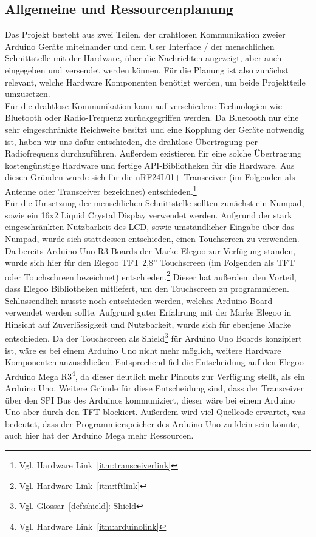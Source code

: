 \documentclass[a4paper, 11pt]{scrartcl}
\begin{document}
\subsection{Allgemeine und Ressourcenplanung}\label{ch:planning}
Das Projekt besteht aus zwei Teilen, der drahtlosen Kommunikation zweier Arduino Geräte miteinander und dem User Interface / der menschlichen Schnittstelle mit der
Hardware, über die Nachrichten angezeigt, aber auch eingegeben und versendet werden können. Für die Planung ist also zunächst relevant, welche Hardware Komponenten benötigt werden, 
um beide Projektteile umzusetzen.
\\
Für die drahtlose Kommunikation kann auf verschiedene Technologien wie Bluetooth oder Radio-Frequenz zurückgegriffen werden. Da Bluetooth nur eine sehr eingeschränkte
Reichweite besitzt und eine Kopplung der Geräte notwendig ist, haben wir uns dafür entschieden, die drahtlose Übertragung per Radiofrequenz durchzuführen. Außerdem existieren
für eine solche Übertragung kostengünstige Hardware und fertige API-Bibliotheken für die Hardware. Aus diesen Gründen wurde sich für die nRF24L01+ Transceiver 
(im Folgenden als \glqq Antenne\grqq{} oder \glqq Transceiver\grqq{} bezeichnet) entschieden.\footnote{Vgl. Hardware Link~\ref{itm:transceiverlink}}
\\
Für die Umsetzung der menschlichen Schnittstelle sollten zunächst ein Numpad, sowie ein 16x2 Liquid Crystal Display verwendet werden. Aufgrund der stark eingeschränkten Nutzbarkeit des LCD,
sowie umständlicher Eingabe über das Numpad, wurde sich stattdessen entschieden, einen Touchscreen zu verwenden. Da bereits Arduino Uno R3 Boards der Marke Elegoo zur Verfügung standen,
wurde sich hier für den Elegoo TFT 2,8'' Touchscreen (im Folgenden als \glqq TFT\grqq{} oder \glqq Touchschreen\grqq{} bezeichnet) entschieden.\footnote{Vgl. Hardware Link~\ref{itm:tftlink}} Dieser
hat außerdem den Vorteil, dass Elegoo Bibliotheken mitliefert, um den Touchscreen zu programmieren.
\\
Schlussendlich musste noch entschieden werden, welches Arduino Board verwendet werden sollte. Aufgrund guter Erfahrung mit der Marke Elegoo in Hinsicht auf Zuverlässigkeit und Nutzbarkeit, wurde sich für
ebenjene Marke entschieden. Da der Touchscreen als Shield\footnote{Vgl. Glossar~\ref{def:shield}: Shield} für Arduino Uno Boards konzipiert ist, wäre es bei einem Arduino Uno nicht mehr möglich,
weitere Hardware Komponenten anzuschließen. Entsprechend fiel die Entscheidung auf den Elegoo Arduino Mega R3\footnote{Vgl. Hardware Link~\ref{itm:arduinolink}}, da dieser deutlich mehr Pinouts zur Verfügung
stellt, als ein Arduino Uno. Weitere Gründe für diese Entscheidung sind, dass der Transceiver über den SPI Bus des Arduinos kommuniziert, dieser wäre bei einem Arduino Uno aber durch den TFT blockiert. Außerdem
wird viel Quellcode erwartet, was bedeutet, dass der Programmierspeicher des Arduino Uno zu klein sein könnte, auch hier hat der Arduino Mega mehr Ressourcen.
\end{document}
